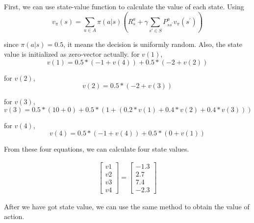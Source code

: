 \documentclass[10pt, a4paper, twocolumn]{article} %
\begin{document}
First, we can use state-value function to calculate the value of each state. Using 
$$v_{\pi}(s) = \sum_{a \in A} \pi(a|s) (R_{s}^a + \gamma \sum_{s'\in S} P^{a}_{s s^{'}} v_{\pi}(s^{'}))$$

since $\pi(a|s) = 0.5$, it means the decision is uniformly random. Also, the state value is initialized as zero-vector actually.
for $v(1)$, $$v(1) = 0.5*(-1 + v(4)) + 0.5*(-2 + v(2))$$

for $v(2)$, $$v(2) = 0.5*(-2 + v(3))$$

for $v(3)$, $$v(3) = 0.5*(10 + 0) + 0.5*(1 + (0.2*v(1) + 0.4*v(2) + 0.4*v(3))) $$

for $v(4)$, $$v(4) = 0.5*(-1 + v(4)) + 0.5*(0 + v(1))$$

From these four equations, we can calculate four state values.

\begin{align*}
	\begin{bmatrix}
			v1\\
			v2\\
			v3\\
			v4
	\end{bmatrix}
	=
	\begin{bmatrix}
		-1.3 \\
		2.7 \\
		7.4 \\
		-2.3 
	\end{bmatrix}
\end{align*}

After we have got state value, we can use the same method to obtain the value of action.


\printbibliography[title={Reference}] %

\end{document}
